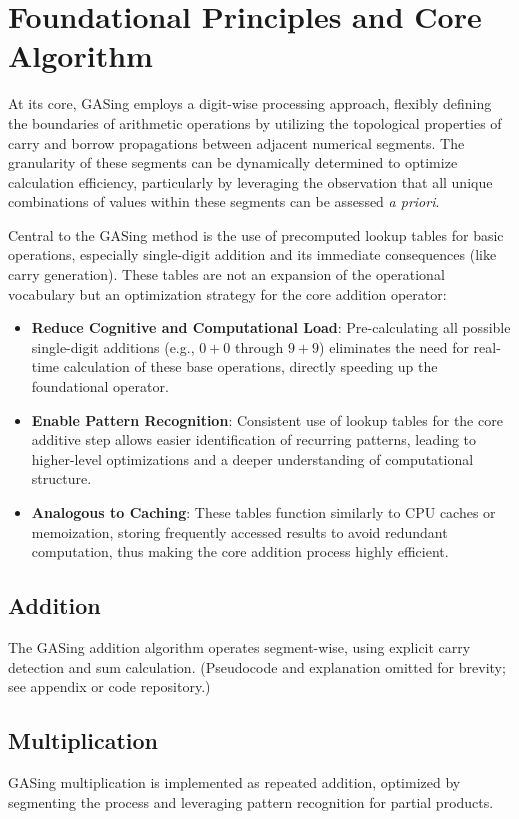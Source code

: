 \section{Foundational Principles and Core Algorithm}

At its core, GASing employs a digit-wise processing approach, flexibly defining the boundaries of arithmetic operations by utilizing the topological properties of carry and borrow propagations between adjacent numerical segments. The granularity of these segments can be dynamically determined to optimize calculation efficiency, particularly by leveraging the observation that all unique combinations of values within these segments can be assessed \emph{a priori}.

Central to the GASing method is the use of precomputed lookup tables for basic operations, especially single-digit addition and its immediate consequences (like carry generation). These tables are not an expansion of the operational vocabulary but an optimization strategy for the core addition operator:
\begin{itemize}
    \item \textbf{Reduce Cognitive and Computational Load}: Pre-calculating all possible single-digit additions (e.g., $0+0$ through $9+9$) eliminates the need for real-time calculation of these base operations, directly speeding up the foundational operator.
    \item \textbf{Enable Pattern Recognition}: Consistent use of lookup tables for the core additive step allows easier identification of recurring patterns, leading to higher-level optimizations and a deeper understanding of computational structure.
    \item \textbf{Analogous to Caching}: These tables function similarly to CPU caches or memoization, storing frequently accessed results to avoid redundant computation, thus making the core addition process highly efficient.
\end{itemize}

\subsection{Addition}
The GASing addition algorithm operates segment-wise, using explicit carry detection and sum calculation. (Pseudocode and explanation omitted for brevity; see appendix or code repository.)

\subsection{Multiplication}
GASing multiplication is implemented as repeated addition, optimized by segmenting the process and leveraging pattern recognition for partial products.

